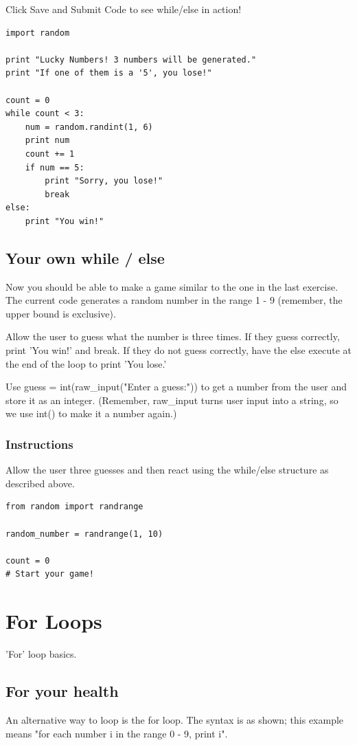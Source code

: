 \documentclass[12pt,a4paper,final,twoside,onecolumn,titlepage]{book}
\begin{document}
Click Save and Submit Code to see while/else in action!
\begin{lstlisting}
import random

print "Lucky Numbers! 3 numbers will be generated."
print "If one of them is a '5', you lose!"

count = 0
while count < 3:
    num = random.randint(1, 6)
    print num
    count += 1
    if num == 5:
        print "Sorry, you lose!"
        break
else:
    print "You win!"
\end{lstlisting}

\subsection{Your own while / else}

Now you should be able to make a game similar to the one in the last exercise. The current code generates a random number in the range 1 - 9 (remember, the upper bound is exclusive).

Allow the user to guess what the number is three times. If they guess correctly, print 'You win!' and break. If they do not guess correctly, have the else execute at the end of the loop to print 'You lose.'

Use guess = int(raw\_input("Enter a guess:")) to get a number from the user and store it as an integer. (Remember, raw\_input turns user input into a string, so we use int() to make it a number again.)
\subsubsection{Instructions}

Allow the user three guesses and then react using the while/else structure as described above.
\begin{lstlisting}
from random import randrange

random_number = randrange(1, 10)

count = 0
# Start your game!
\end{lstlisting}

\section{For Loops}
'For' loop basics.
\subsection{For your health}

An alternative way to loop is the for loop. The syntax is as shown; this example means "for each number i in the range 0 - 9, print i".
\end{document}
